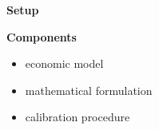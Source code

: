 \begin{frame}\begin{center}
\LARGE\textbf{Setup}
\end{center}\end{frame}
\begin{frame}
\textbf{Components}\vspace{0.5cm}
\begin{itemize}\setlength\itemsep{1em}
\item economic model
\item mathematical formulation
\item calibration procedure
\end{itemize}
\end{frame}





